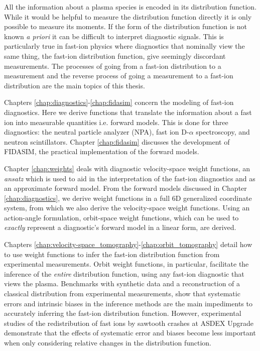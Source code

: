 \thesisabstract
{
All the information about a plasma species is encoded in its distribution function. While it would be helpful to measure the distribution function directly it is only possible to measure its moments. If the form of the distribution function is not known \textit{a priori} it can be difficult to interpret diagnostic signals. This is particularly true in fast-ion physics where diagnostics that nominally view the same thing, the fast-ion distribution function, give seemingly discordant measurements. The processes of going from a fast-ion distribution to a measurement and the reverse process of going a measurement to a fast-ion distribution are the main topics of this thesis.

Chapters \ref{chap:diagnostics}-\ref{chap:fidasim} concern the modeling of fast-ion diagnostics. Here we derive functions that translate the information about a fast ion into measurable quantities i.e. forward models. This is done for three diagnostics: the neutral particle analyzer (NPA), fast ion D-$\alpha$ spectroscopy, and neutron scintillators. Chapter \ref{chap:fidasim} discusses the development of FIDASIM\cite{heidbrink2011code,geiger2013thesis,FIDASIM}, the practical implementation of the forward models.

Chapter \ref{chap:weights} deals with diagnostic velocity-space weight functions, an \textit{ansatz} which is used to aid in the interpretation of the fast-ion diagnostics and as an approximate forward model. From the forward models discussed in Chapter \ref{chap:diagnostics}, we derive weight functions in a full 6D generalized coordinate system, from which we also derive the velocity-space weight functions. Using an action-angle formulation, orbit-space weight functions, which can be used to \textit{exactly} represent a diagnostic's forward model in a linear form, are derived.

Chapters \ref{chap:velocity-space_tomography}-\ref{chap:orbit_tomography} detail how to use weight functions to infer the fast-ion distribution function from experimental measurements. Orbit weight functions, in particular, facilitate the inference of the \textit{entire} distribution function, using any fast-ion diagnostic that views the plasma. Benchmarks with synthetic data and a reconstruction of a classical distribution from experimental measurements, show that systematic errors and intrinsic biases in the inference methods are the main impediments to accurately inferring the fast-ion distribution function. However, experimental studies of the redistribution of fast ions by sawtooth crashes at ASDEX Upgrade demonstrate that the effects of systematic error and biases become less important when only considering relative changes in the distribution function. 
}


